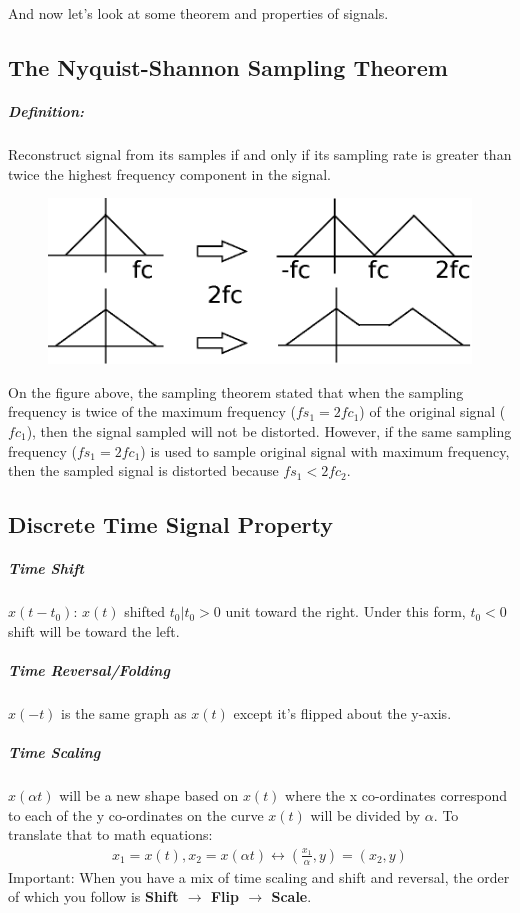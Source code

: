 \documentclass[12pt, letterpaper]{article}
\begin{document}
And now let's look at some theorem and properties of signals.

\subsection*{The Nyquist-Shannon Sampling Theorem}
\subparagraph*{Definition:}Reconstruct signal from its samples if and only if its sampling rate is greater than twice the highest frequency component in the signal.
\begin{figure}[h]
    \includegraphics[width=\textwidth]{./images/lec1/FVE_image_2}
\end{figure}

On the figure above, the sampling theorem stated that when the sampling frequency is twice of the maximum frequency ($fs_1=2fc_1$) of the original signal ($fc_1$), then the signal sampled will not be distorted. However, if the same sampling frequency ($fs_1=2fc_1$) is used to sample original signal with maximum frequency, then the sampled signal is distorted because $fs_1 < 2fc_2$. 

\subsection*{Discrete Time Signal Property}
\subparagraph*{Time Shift} $x(t - t_0)$: $x(t)$ shifted $t_0 | t_0>0$ unit toward the right. Under this form, $t_0<0$ shift will be toward the left.
\subparagraph*{Time Reversal/Folding} $x(-t)$ is the same graph as $x(t)$ except it's flipped about the y-axis.
\subparagraph*{Time Scaling} $x(\alpha t)$ will be a new shape based on $x(t)$ where the x co-ordinates correspond to each of the y co-ordinates on the curve $x(t)$ will be divided by $\alpha$. To translate that to math equations:
\begin{align*}
    x_1 = x(t), x_2 = x(\alpha t) \leftrightarrow (\frac{x_1}{\alpha}, y) = (x_2, y)
\end{align*}
Important: When you have a mix of time scaling and shift and reversal, the order of which you follow is \textbf{Shift $\rightarrow$ Flip $\rightarrow$ Scale}.
\end{document}

